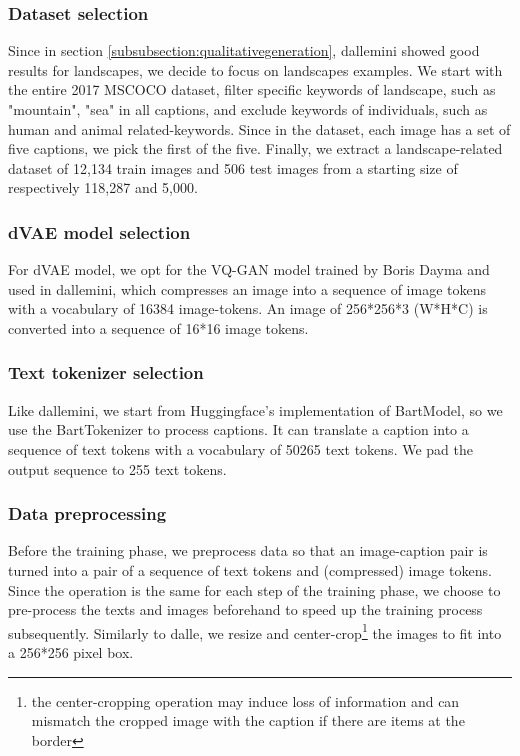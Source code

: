 \documentclass{article}
\begin{document}
\begin{multicols}{2}
\subsubsection{Dataset selection}

Since in section \ref{subsubsection:qualitativegeneration}, \gls{dallemini} showed good results for landscapes, we decide to focus on landscapes examples. We start with the entire 2017 MSCOCO dataset, filter specific keywords of landscape, such as "mountain", "sea" in all captions, and exclude keywords of individuals, such as human and animal related-keywords. Since in the dataset, each image has a set of five captions, we pick the first of the five. Finally, we extract a landscape-related dataset of 12,134 train images and 506 test images from a starting size of respectively 118,287 and 5,000.

\subsubsection{dVAE model selection}

For dVAE model, we opt for the VQ-GAN model trained by Boris Dayma and used in \gls{dallemini}, which compresses an image into a sequence of image tokens with a vocabulary of 16384 image-tokens. An image of 256*256*3 (W*H*C) is converted into a sequence of 16*16 image tokens.

\subsubsection{Text tokenizer selection}
Like \gls{dallemini}, we start from Huggingface's implementation of BartModel, so we use the BartTokenizer to process captions. It can translate a caption into a sequence of text tokens with a vocabulary of 50265 text tokens. We pad the output sequence to 255 text tokens.

\subsubsection{Data preprocessing}

Before the training phase, we preprocess data so that an image-caption pair is turned into a pair of a sequence of text tokens and (compressed) image tokens. Since the operation is the same for each step of the training phase, we choose to pre-process the texts and images beforehand to speed up the training process subsequently. Similarly to \gls{dalle}, we resize and center-crop\footnote{the center-cropping operation may induce loss of information and can mismatch the cropped image with the caption if there are items at the border} the images to fit into a 256*256 pixel box.


\end{multicols}
\end{document}
